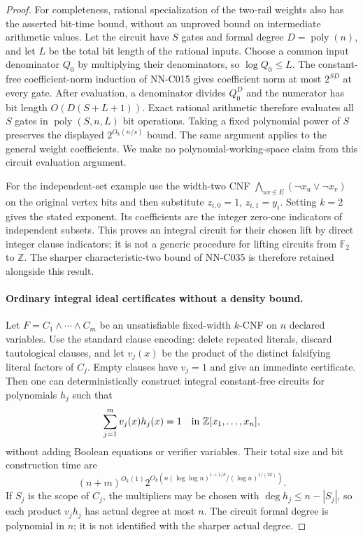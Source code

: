 \begin{proof}
For completeness, rational specialization of the two-rail weights also has the asserted bit-time bound, without an unproved bound on intermediate arithmetic values. Let the circuit have $S$ gates and formal degree $D=\operatorname{poly}(n)$, and let $L$ be the total bit length of the rational inputs. Choose a common input denominator $Q_0$ by multiplying their denominators, so $\log Q_0\le L$. The constant-free coefficient-norm induction of NN-C015 gives coefficient norm at most $2^{SD}$ at every gate. After evaluation, a denominator divides $Q_0^D$ and the numerator has bit length $O(D(S+L+1))$. Exact rational arithmetic therefore evaluates all $S$ gates in $\operatorname{poly}(S,n,L)$ bit operations. Taking a fixed polynomial power of $S$ preserves the displayed $2^{O_k(n/s)}$ bound. The same argument applies to the general weight coefficients. We make no polynomial-working-space claim from this circuit evaluation argument.

For the independent-set example use the width-two CNF $\bigwedge_{uv\in E}(\neg x_u\vee\neg x_v)$ on the original vertex bits and then substitute $z_{i,0}=1$, $z_{i,1}=y_i$. Setting $k=2$ gives the stated exponent. Its coefficients are the integer zero-one indicators of independent subsets. This proves an integral circuit for their chosen lift by direct integer clause indicators; it is not a generic procedure for lifting circuits from $\mathbb F_2$ to $\mathbb Z$. The sharper characteristic-two bound of NN-C035 is therefore retained alongside this result.

\paragraph{Ordinary integral ideal certificates without a density bound.}
Let $F=C_1\wedge\cdots\wedge C_m$ be an unsatisfiable fixed-width
$k$-CNF on $n$ declared variables.  Use the standard clause encoding:
delete repeated literals, discard tautological clauses, and let
$v_j(x)$ be the product of the distinct falsifying literal factors
of $C_j$.  Empty clauses have $v_j=1$ and give an immediate
certificate.  Then one can deterministically construct integral
constant-free circuits for polynomials $h_j$ such that
\[
                 \sum_{j=1}^m v_j(x)h_j(x)=1
                              \quad\hbox{in }\mathbb Z[x_1,\ldots,x_n],
\]
without adding Boolean equations or verifier variables.  Their
total size and bit construction time are
\[
 (n+m)^{O_k(1)}
  2^{O_k(n(\log\log n)^{1+1/k}/(\log n)^{1/(2k)})}.
\]
If $S_j$ is the scope of $C_j$, the multipliers may be chosen
with $\deg h_j\le n-|S_j|$, so each product $v_jh_j$ has actual
degree at most $n$.  The circuit formal degree is polynomial
in $n$; it is not identified with the sharper actual degree.


\end{proof}
